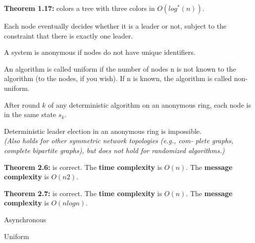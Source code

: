 {
	\begin{items}
		\item {\bf Theorem 1.17:} colors a tree with three colors in $O(log^{*}(n))$.
	\end{items}
}




{
	Each node eventually decides whether it is a leader or not, subject to the
	constraint that there is exactly one leader.
}

{
	A system is anonymous if nodes do not have unique identifiers.
}

{
	An algorithm is called uniform if the number of nodes n is not known to the
	algorithm (to the nodes, if you wish). If n is known, the algorithm is called
	non-uniform. 
}

{
	After round $k$ of any deterministic algorithm on an anonymous ring, each node
	is in the same state $s_k$.
}

{
	Deterministic leader election in an anonymous ring is impossible.\\
	{\it (Also holds for other symmetric network topologies (e.g., com- plete
	graphs, complete bipartite graphs), but does not hold for randomized
	algorithms.)} 
}

{
	\begin{items}
		\item {\bf Theorem 2.6:} is correct. The {\bf time complexity} is $O(n)$. The
		{\bf message complexity} is $O(n2)$.
	\end{items}
}

{
	\begin{items}
		\item {\bf Theorem 2.7:} is correct. The {\bf time complexity} is $O(n)$.
		The {\bf message complexity} is $O(n log n)$.
		\item Asynchronous
		\item Uniform
	\end{items}
}

